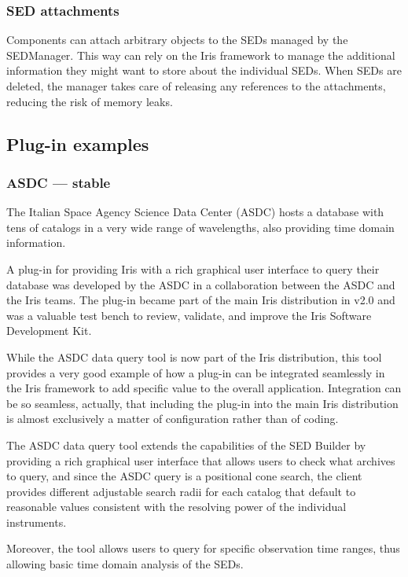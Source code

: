 \documentclass[final,5p,authoryear]{elsarticle}
\begin{document}
\subsubsection{SED attachments} Components can attach arbitrary objects to the
SEDs managed by the SEDManager. This way can rely on the Iris framework to
manage the additional information they might want to store about the individual
SEDs. When SEDs are deleted, the manager takes care of releasing any references
to the attachments, reducing the risk of memory leaks.



\subsection{Plug-in examples} \subsubsection{ASDC --- stable} The Italian Space
Agency Science Data Center (ASDC) hosts a database with tens of catalogs in a
very wide range of wavelengths, also providing time domain information.

A plug-in for providing Iris with a rich graphical user interface to query their
database was developed by the ASDC in a collaboration between the ASDC and the
Iris teams. The plug-in became part of the main Iris distribution in v2.0 and
was a valuable test bench to review, validate, and improve the Iris
Software Development Kit.

While the ASDC data query tool is now part of the Iris distribution, this tool
provides a very good example of how a plug-in can be integrated seamlessly in
the Iris framework to add specific value to the overall application.
Integration can be so seamless,
actually, that including the plug-in into the main Iris distribution is almost
exclusively a matter of configuration rather than of coding.

The ASDC data query tool extends the capabilities of the SED Builder by
providing a rich graphical user interface that allows users to check what
archives to query, and since the ASDC query is a positional cone search, the
client provides different adjustable search radii for each catalog that default
to reasonable values consistent with the resolving power of the individual
instruments.

Moreover, the tool allows users to query for specific observation time ranges, thus
allowing basic time domain analysis of the SEDs.
\end{document}
